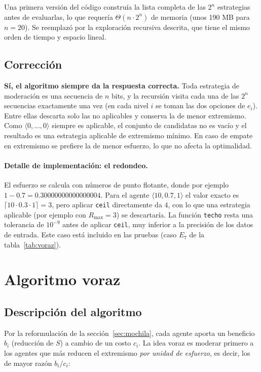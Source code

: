 \documentclass[11pt,letterpaper]{article}
\newcommand{\E}[1]{\ensuremath{\langle #1 \rangle}}
\newcommand{\Rmax}{R_{\max}}
\begin{document}
Una primera versión del código construía la lista completa de las $2^n$
estrategias antes de evaluarlas, lo que requería $\Theta(n\cdot 2^n)$ de
memoria (unos 190 MB para $n = 20$). Se reemplazó por la exploración
recursiva descrita, que tiene el mismo orden de tiempo y espacio lineal.

\subsection{Corrección}

\textbf{Sí, el algoritmo siempre da la respuesta correcta.} Toda estrategia de
moderación es una secuencia de $n$ bits, y la recursión visita cada una de las
$2^n$ secuencias exactamente una vez (en cada nivel $i$ se toman las dos
opciones de $e_i$). Entre ellas descarta solo las no aplicables y conserva la
de menor extremismo. Como $\E{0,\dots,0}$ siempre es aplicable, el conjunto de
candidatas no es vacío y el resultado es una estrategia aplicable de
extremismo mínimo. En caso de empate en extremismo se prefiere la de menor
esfuerzo, lo que no afecta la optimalidad.

\paragraph{Detalle de implementación: el redondeo.} El esfuerzo se calcula con
números de punto flotante, donde por ejemplo $1 - 0.7 = 0.30000000000000004$.
Para el agente $\langle 10, 0.7, 1\rangle$ el valor exacto es
$\lceil 10\cdot 0.3 \cdot 1\rceil = 3$, pero aplicar \texttt{ceil}
directamente da $4$, con lo que una estrategia aplicable (por ejemplo con
$\Rmax = 3$) se descartaría. La función \texttt{techo} resta una tolerancia de
$10^{-9}$ antes de aplicar \texttt{ceil}, muy inferior a la precisión de los
datos de entrada. Este caso está incluido en las pruebas (caso $E_7$ de la
tabla~\ref{tab:voraz}).

\section{Algoritmo voraz}

\subsection{Descripción del algoritmo}

Por la reformulación de la sección~\ref{sec:mochila}, cada agente aporta un
beneficio $b_i$ (reducción de $S$) a cambio de un costo $c_i$. La idea voraz
es moderar primero a los agentes que más reducen el extremismo \emph{por
unidad de esfuerzo}, es decir, los de mayor razón $b_i / c_i$:
\end{document}
